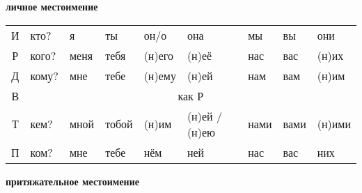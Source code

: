 \documentclass[a4paper, landscape, 11pt]{article}
\begin{document}
\strut\vfil

\begin{center}
	\Huge\bfseries личное местоимение
\end{center}

\begin{tabularx}{\textwidth}{|c|X|X|X|X|X|X|X|X|}
	\hline
	И & кто?  & я    & ты    & он/о   & она           & мы   & вы   & они    \\ %
	Р & кого? & меня & тебя  & (н)его & (н)её         & нас  & вас  & (н)их  \\ %
	Д & кому? & мне  & тебе  & (н)ему & (н)ей         & нам  & вам  & (н)им  \\ \cline{2-9}
	В &                      \multicolumn{8}{c|}{как Р}                      \\ \cline{2-9}
	Т & кем?  & мной & тобой & (н)им  & (н)ей / (н)ею & нами & вами & (н)ими \\ %
	П & ком?  & мне  & тебе  & нём    & ней           & нас  & вас  & них    \\ \hline
\end{tabularx}

\vfill

\begin{center}
	\Huge\bfseries притяжательное местоимение
\end{center}
\end{document}
